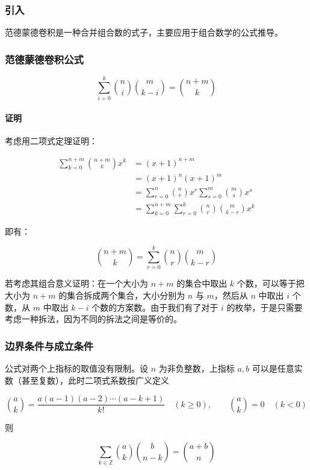 \subsubsection*{引入}

范德蒙德卷积是一种合并组合数的式子，主要应用于组合数学的公式推导。

\hrulefill

\subsubsection*{范德蒙德卷积公式}

$$
\sum_{i=0}^k\binom{n}{i}\binom{m}{k-i}=\binom{n+m}{k}
$$

\paragraph{证明}
考虑用二项式定理证明：

$$
\begin{aligned}
\sum_{k=0}^{n+m}\binom{n+m}{k}x^k&=(x+1)^{n+m}\\
&=(x+1)^n(x+1)^m\\
&=\sum_{r=0}^n\binom{n}{r}x^r\sum_{s=0}^m\binom{m}{s}x^s\\
&=\sum_{k=0}^{n+m}\sum_{r=0}^k\binom{n}{r}\binom{m}{k-r}x^k
\end{aligned}
$$

即有：

$$
\binom{n+m}{k}=\sum_{r=0}^k\binom{n}{r}\binom{m}{k-r}
$$

若考虑其组合意义证明：在一个大小为 $n+m$ 的集合中取出 $k$ 个数，可以等于把大小为 $n+m$ 的集合拆成两个集合，大小分别为 $n$ 与 $m$，然后从 $n$ 中取出 $i$ 个数，从 $m$ 中取出 $k-i$ 个数的方案数。由于我们有了对于 $i$ 的枚举，于是只需要考虑一种拆法，因为不同的拆法之间是等价的。

\hrulefill

\subsubsection*{边界条件与成立条件}

公式对两个上指标的取值没有限制。设 $n$ 为非负整数，上指标 $a,b$ 可以是任意实数（甚至复数），此时二项式系数按广义定义

$$
\binom{a}{k}=\frac{a(a-1)(a-2)\cdots(a-k+1)}{k!}\quad(k\ge 0),\qquad
\binom{a}{k}=0\quad(k<0)
$$

则

$$
\sum_{k\in\mathbb{Z}}\binom{a}{k}\binom{b}{n-k}=\binom{a+b}{n}
$$


